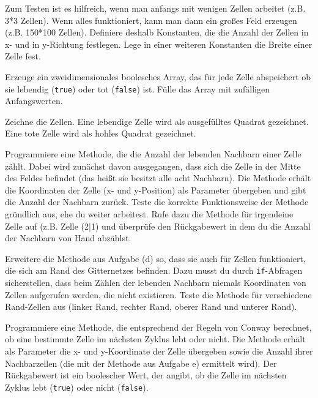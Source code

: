 \begin{compactenum}[a)]
\item Zum Testen ist es hilfreich, wenn man anfangs mit wenigen Zellen
arbeitet (z.B. 3*3 Zellen). Wenn alles funktioniert, kann man dann ein großes
Feld erzeugen (z.B. 150*100 Zellen). Definiere deshalb Konstanten, die die
Anzahl der Zellen in x- und in y-Richtung festlegen.  Lege in einer weiteren
Konstanten die Breite einer Zelle fest.

\item Erzeuge ein zweidimensionales boolesches Array, das für jede Zelle
abspeichert ob sie lebendig (\lstinline|true|) oder tot (\lstinline|false|) ist.
Fülle das Array mit zufälligen Anfangswerten.

\item Zeichne die Zellen. Eine lebendige Zelle wird als ausgefülltes Quadrat
gezeichnet. Eine tote Zelle wird als hohles Quadrat gezeichnet.

\item Programmiere eine Methode, die die Anzahl der lebenden Nachbarn einer
Zelle zählt. Dabei wird zunächst davon ausgegangen, dass sich die Zelle in der
Mitte des Feldes befindet (das heißt sie besitzt alle acht Nachbarn). Die
Methode erhält die Koordinaten der Zelle (x- und y-Position) als Parameter
übergeben und gibt die Anzahl der Nachbarn zurück. Teste die korrekte
Funktionsweise der Methode gründlich aus, ehe du weiter arbeitest. Rufe dazu
die Methode für irgendeine Zelle auf (z.B. Zelle (2|1) und überprüfe den
Rückgabewert in dem du die Anzahl der Nachbarn von Hand abzählst.

\item Erweitere die Methode aus Aufgabe (d) so, dass sie auch für Zellen
funktioniert, die sich am Rand des Gitternetzes befinden. Dazu musst du durch
\lstinline|if|-Abfragen sicherstellen, dass beim Zählen der lebenden Nachbarn
niemals Koordinaten von Zellen aufgerufen werden, die nicht existieren. Teste
die Methode für verschiedene Rand-Zellen aus (linker Rand, rechter Rand, oberer
Rand und unterer Rand).

\item Programmiere eine Methode, die entsprechend der Regeln von Conway
berechnet, ob eine bestimmte Zelle im nächsten Zyklus lebt oder nicht. Die
Methode erhält als Parameter die x- und y-Koordinate der Zelle übergeben sowie
die Anzahl ihrer Nachbarzellen (die mit der Methode aus Aufgabe e) ermittelt
wird). Der Rückgabewert ist ein boolescher Wert, der angibt, ob die Zelle im
nächsten Zyklus lebt (\lstinline|true|) oder nicht (\lstinline|false|).


\end{compactenum}
